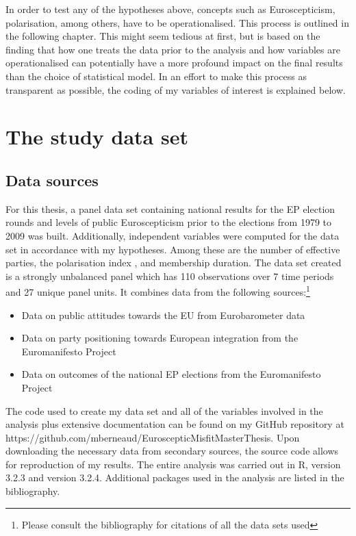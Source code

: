 In order to test any of the hypotheses above, concepts such as Euroscepticism, polarisation, among others, have to be operationalised. This process is outlined in the following chapter. This might seem tedious at first, but is based on the finding that how one treats the data prior to the analysis and how variables are operationalised can potentially have a more profound impact on the final results than the choice of statistical model. In an effort to make this process as transparent as possible, the coding of my variables of interest is explained below. 

\chapter{The study data set}
\section{Data sources}
\nocite{EB1979}
\nocite{EB1984}
\nocite{EB1989}
\nocite{EB1994}
\nocite{EB1995}
\nocite{EB1996}
\nocite{EB1999}
\nocite{EB2004}
\nocite{EB2009}
\nocite{EMP}

For this thesis, a panel data set containing national results for the EP election rounds and levels of public Euroscepticism prior to the elections from 1979 to 2009 was built.  Additionally, independent variables were computed for the data set in accordance with my hypotheses. Among these are the number of effective parties, the polarisation index \cite{Dalton2008}, and membership duration.  The data set created is a strongly unbalanced panel which has 110 observations over 7 time periods and 27 unique panel units. It combines data from the following sources:\footnote{Please consult the bibliography for citations of all the data sets used} 

\begin{itemize}
	\item Data on public attitudes towards the EU from Eurobarometer data
	\item Data on party positioning towards European integration from the Euromanifesto Project
	\item Data on outcomes of the national EP elections from the Euromanifesto Project
\end{itemize}

The code used to create my data set and all of the variables involved in the analysis plus extensive documentation can be found on my GitHub repository at \\ https://github.com/mberneaud/EuroscepticMisfitMasterThesis. Upon downloading the necessary data from secondary sources, the source code allows for reproduction of my results. The entire analysis was carried out in R, version 3.2.3 and version 3.2.4. Additional packages used in the analysis are listed in the bibliography. 

